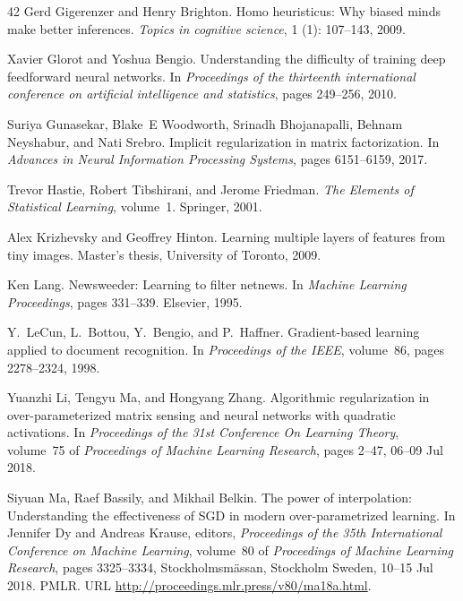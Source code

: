 \documentclass[11pt]{article}
\begin{document}
\begin{thebibliography}{42}
Gerd Gigerenzer and Henry Brighton.
\newblock Homo heuristicus: Why biased minds make better inferences.
\newblock \emph{Topics in cognitive science}, 1 (1):
  107--143, 2009.

Xavier Glorot and Yoshua Bengio.
\newblock Understanding the difficulty of training deep feedforward neural
  networks.
\newblock In \emph{Proceedings of the thirteenth international conference on
  artificial intelligence and statistics}, pages 249--256, 2010.

Suriya Gunasekar, Blake~E Woodworth, Srinadh Bhojanapalli, Behnam Neyshabur,
  and Nati Srebro.
\newblock Implicit regularization in matrix factorization.
\newblock In \emph{Advances in Neural Information Processing Systems}, pages
  6151--6159, 2017.

Trevor Hastie, Robert Tibshirani, and Jerome Friedman.
\newblock \emph{The Elements of Statistical Learning}, volume~1.
\newblock Springer, 2001.

Alex Krizhevsky and Geoffrey Hinton.
\newblock Learning multiple layers of features from tiny images.
\newblock Master's thesis, University of Toronto, 2009.

Ken Lang.
\newblock Newsweeder: Learning to filter netnews.
\newblock In \emph{Machine Learning Proceedings}, pages 331--339. Elsevier,
  1995.

Y.~LeCun, L.~Bottou, Y.~Bengio, and P.~Haffner.
\newblock Gradient-based learning applied to document recognition.
\newblock In \emph{Proceedings of the IEEE}, volume~86, pages 2278--2324, 1998.

Yuanzhi Li, Tengyu Ma, and Hongyang Zhang.
\newblock Algorithmic regularization in over-parameterized matrix sensing and
  neural networks with quadratic activations.
\newblock In \emph{Proceedings of the 31st Conference On Learning Theory},
  volume~75 of \emph{Proceedings of Machine Learning Research}, pages 2--47,
  06--09 Jul 2018.

Siyuan Ma, Raef Bassily, and Mikhail Belkin.
\newblock The power of interpolation: Understanding the effectiveness of {SGD}
  in modern over-parametrized learning.
\newblock In Jennifer Dy and Andreas Krause, editors, \emph{Proceedings of the
  35th International Conference on Machine Learning}, volume~80 of
  \emph{Proceedings of Machine Learning Research}, pages 3325--3334,
  Stockholmsmässan, Stockholm Sweden, 10--15 Jul 2018. PMLR.
\newblock URL \url{http://proceedings.mlr.press/v80/ma18a.html}.


\end{thebibliography}
\end{document}
